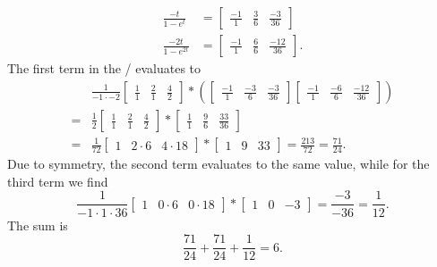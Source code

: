 \begin{example}
\begin{align*}
\\
\frac{-t}{1-e^{t}} & = 
\begin{bmatrix}
\displaystyle\frac{-1}{1} & \displaystyle\frac{3}{6} & \displaystyle\frac{-3}{36}
\end{bmatrix}
\\
\frac{-2t}{1-e^{2t}} & = 
\begin{bmatrix}
\displaystyle\frac{-1}{1} & \displaystyle\frac{6}{6} & \displaystyle\frac{-12}{36}
\end{bmatrix}
.
\end{align*}
The first term in the \rgf/ evaluates to
\begin{align*}
&
\frac 1{-1 \cdot -2}
\begin{bmatrix}
\displaystyle\frac{1}{1} & \displaystyle\frac{2}{1} & \displaystyle\frac{4}{2}
\end{bmatrix}
*
\left(
\begin{bmatrix}
\displaystyle\frac{-1}{1} & \displaystyle\frac{-3}{6} & \displaystyle\frac{-3}{36}
\end{bmatrix}
\begin{bmatrix}
\displaystyle\frac{-1}{1} & \displaystyle\frac{-6}{6} & \displaystyle\frac{-12}{36}
\end{bmatrix}
\right)
\\
= {} &
\frac 1{2}
\begin{bmatrix}
\displaystyle\frac{1}{1} & \displaystyle\frac{2}{1} & \displaystyle\frac{4}{2}
\end{bmatrix}
*
\begin{bmatrix}
\displaystyle\frac{1}{1} & \displaystyle\frac{9}{6} & \displaystyle\frac{33}{36}
\end{bmatrix}
\\
= {} &
\frac 1{72}
\begin{bmatrix}
1 & 2 \cdot 6 & 4 \cdot 18
\end{bmatrix}
*
\begin{bmatrix}
1 & 9 & 33
\end{bmatrix}
= \frac {213}{72} = \frac{71}{24}
.
\end{align*}
Due to symmetry, the second term evaluates to the same value,
while for the third term we find
$$
\frac{1}{-1\cdot 1 \cdot 36}
\begin{bmatrix}
1 & 0 \cdot 6 & 0 \cdot 18
\end{bmatrix}
*
\begin{bmatrix}
1 & 0 & -3
\end{bmatrix}
=
\frac{-3}{-36} = \frac 1{12}
.
$$
The sum is
$$
\frac{71}{24} + \frac{71}{24} + \frac 1{12} = 6
.
$$
\end{example}

